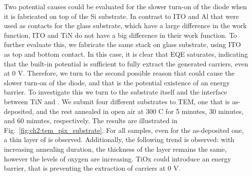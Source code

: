 Two potential causes could be evaluated for the slower turn-on of the diode when it is fabricated on top of the Si substrate. In contrast to ITO and Al that were used as contacts for the glass substrate, which have a large difference in the work function, ITO and TiN do not have a big difference in their work function. To further evaluate this, we fabricate the same stack on glass substrate, using ITO as top and bottom contact. In this case, it is clear that EQE saturates, indicating that the built-in potential is sufficient to fully extract the generated carriers, even at 0 V. Therefore, we turn to the second possible reason that could cause the slower turn-on of the diode, and that is the potential existence of an energy barrier. To investigate this we turn to the substrate itself and the interface between TiN and . We submit four different substrates to TEM, one that is as-deposited, and the rest annealed in open air at 300 \degree C for 5 minutes, 30 minutes, and 60 minutes, respectively. The results are illustrated in Fig.~\ref{fig:ch2:tem_pix_substrate}. For all samples, even for the as-deposited one, a thin layer of  is observed. Additionally, the following trend is observed: with increasing annealing duration, the thickness of the  layer remains the same, however the levels of oxygen are increasing. TiOx could introduce an energy barrier, that is preventing the extraction of carriers at 0 V.


